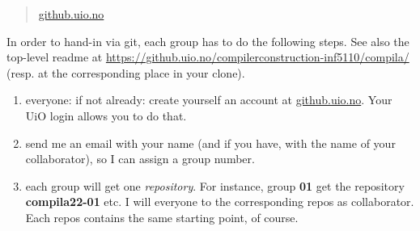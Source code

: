 \documentclass[10pt,freeform]{handout}[2014/08/13]
\begin{document}
\begin{quote}
  \url{github.uio.no}
\end{quote}


In order to hand-in via git, each group has to do the following steps. See
also the top-level readme at
\url{https://github.uio.no/compilerconstruction-inf5110/compila/} (resp. at
the corresponding place in your clone).

\begin{enumerate}
\item everyone: if not already: create yourself an account at
  \url{github.uio.no}. Your UiO login allows you to do that.
\item send me an email with your name (and if you have, with the name of
  your collaborator), so I can assign a group number.
\item each group will get one \emph{repository}. For instance, group
  \textbf{01} get the repository \textbf{compila22-01} etc.  I will
  everyone to the corresponding repos as collaborator. Each repos contains
  the same starting point, of course.
\end{enumerate}
\end{document}
